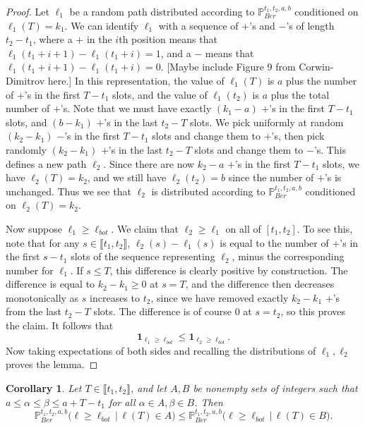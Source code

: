 \documentclass[12pt]{article}
\newtheorem{cor}{Corollary}
\begin{document}
	\begin{proof}
		Let $\ell_1$ be a random path distributed according to $\mathbb{P}^{t_1, t_2, a, b}_{Ber}$ conditioned on $\ell_1(T) = k_1$. We can identify $\ell_1$ with a sequence of $+$'s and $-$'s of length $t_2-t_1$, where a $+$ in the $i$th position means that $\ell_1(t_1+i+1)-\ell_1(t_1+i) = 1$, and a $-$ means that $\ell_1(t_1+i+1)-\ell_1(t_1+i) = 0$. [Maybe include Figure 9 from Corwin-Dimitrov here.] In this representation, the value of $\ell_1(T)$ is $a$ plus the number of $+$'s in the first $T-t_1$ slots, and the value of $\ell_1(t_2)$ is $a$ plus the total number of $+$'s. Note that we must have exactly $(k_1-a)$ $+$'s in the first $T-t_1$ slots, and $(b-k_1)$ $+$'s in the last $t_2-T$ slots. We pick uniformly at random $(k_2-k_1)$ $-$'s in the first $T-t_1$ slots and change them to $+$'s, then pick randomly $(k_2-k_1)$ $+$'s in the last $t_2-T$ slots and change them to $-$'s. This defines a new path $\ell_2$. Since there are now $k_2-a$ $+$'s in the first $T-t_1$ slots, we have $\ell_2(T) = k_2$, and we still have $\ell_2(t_2) = b$ since the number of $+$'s is unchanged. Thus we see that $\ell_2$ is distributed according to $\mathbb{P}^{t_1,t_2,a,b}_{Ber}$ conditioned on $\ell_2(T) = k_2$. 
		
		Now suppose $\ell_1 \geq \ell_{bot}$. We claim that $\ell_2 \geq \ell_1$ on all of $[t_1,t_2]$. To see this, note that for any $s\in\llbracket t_1, t_2\rrbracket$, $\ell_2(s) - \ell_1(s)$ is equal to the number of $+$'s in the first $s-t_1$ slots of the sequence representing $\ell_2$, minus the corresponding number for $\ell_1$. If $s\leq T$, this difference is clearly positive by construction. The difference is equal to $k_2 - k_1 \geq 0$ at $s = T$, and the difference then decreases monotonically as $s$ increases to $t_2$, since we have removed exactly $k_2-k_1$ $+$'s from the last $t_2-T$ slots. The difference is of course 0 at $s = t_2$, so this proves the claim. It follows that
		\[
		\mathbf{1}_{\ell_1 \geq \ell_{bot}} \leq \mathbf{1}_{\ell_2 \geq \ell_{bot}}.
		\]
		Now taking expectations of both sides and recalling the distributions of $\ell_1,\ell_2$ proves the lemma.
	\end{proof}


	\begin{cor}
		Let $T\in\llbracket t_1, t_2\rrbracket$, and let $A, B$ be nonempty sets of integers such that $a \leq \alpha \leq \beta \leq a+T-t_1$ for all $\alpha\in A, \beta\in B$. Then
		\[
		\mathbb{P}^{t_1, t_2, a, b}_{Ber}\big(\ell \geq \ell_{bot}\,\big|\,\ell(T) \in A\big) \leq \mathbb{P}^{t_1, t_2, a, b}_{Ber}\big(\ell \geq \ell_{bot}\,\big|\,\ell(T) \in B\big).
		\]
	\end{cor}
\end{document}
